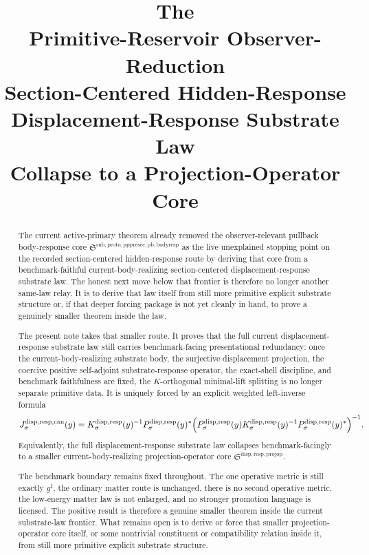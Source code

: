\documentclass[11pt]{article}
\title{\textbf{The \TheoryName{}}\\[0.4em]
\large Primitive-Reservoir Observer-Reduction\\
\large Section-Centered Hidden-Response\\
\large Displacement-Response Substrate Law\\
\large Collapse to a Projection-Operator Core}
\author{}
\date{}
\newcommand{\CompletedMetric}{g^{\sharp}}
\newcommand{\PullbackBodyResponseCore}{\mathfrak S^{\mathrm{sub,proto,pppresec,pb,bodyresp}}}
\newcommand{\ProjectionOperatorCore}{\mathfrak S^{\mathrm{disp,resp,projop}}}
\newcommand{\SubstrateProjection}[1]{P_{#1}^{\mathrm{disp,resp}}}
\newcommand{\SubstrateOperator}[1]{K_{#1}^{\mathrm{disp,resp}}}
\newcommand{\CanonicalLift}[1]{J_{#1}^{\mathrm{disp,resp,can}}}
\begin{document}
\maketitle

\begin{abstract}
The current active-primary theorem already removed the observer-relevant pullback body-response core \(\PullbackBodyResponseCore\) as the live unexplained stopping point on the recorded section-centered hidden-response route by deriving that core from a benchmark-faithful current-body-realizing section-centered displacement-response substrate law. The honest next move below that frontier is therefore no longer another same-law relay. It is to derive that law itself from still more primitive explicit substrate structure or, if that deeper forcing package is not yet cleanly in hand, to prove a genuinely smaller theorem inside the law.

The present note takes that smaller route. It proves that the full current displacement-response substrate law still carries benchmark-facing presentational redundancy: once the current-body-realizing substrate body, the surjective displacement projection, the coercive positive self-adjoint substrate-response operator, the exact-shell discipline, and benchmark faithfulness are fixed, the \(K\)-orthogonal minimal-lift splitting is no longer separate primitive data. It is uniquely forced by an explicit weighted left-inverse formula
\[
\CanonicalLift{\sigma}(y)
=
\SubstrateOperator{\sigma}(y)^{-1}\SubstrateProjection{\sigma}(y)^{*}
\Bigl(
\SubstrateProjection{\sigma}(y)\SubstrateOperator{\sigma}(y)^{-1}\SubstrateProjection{\sigma}(y)^{*}
\Bigr)^{-1}.
\]
Equivalently, the full displacement-response substrate law collapses benchmark-facingly to a smaller current-body-realizing projection-operator core \(\ProjectionOperatorCore\).

The benchmark boundary remains fixed throughout. The one operative metric is still exactly \(\CompletedMetric\), the ordinary matter route is unchanged, there is no second operative metric, the low-energy matter law is not enlarged, and no stronger promotion language is licensed. The positive result is therefore a genuine smaller theorem inside the current substrate-law frontier. What remains open is to derive or force that smaller projection-operator core itself, or some nontrivial constituent or compatibility relation inside it, from still more primitive explicit substrate structure.
\end{abstract}
\end{document}
